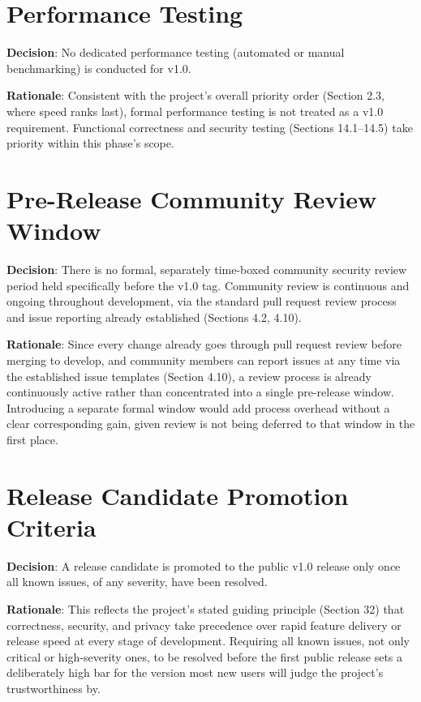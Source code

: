 \section{Performance Testing}
\textbf{Decision}: No dedicated performance testing (automated or manual benchmarking) is conducted for v1.0.

\textbf{Rationale}: Consistent with the project's overall priority order (Section 2.3, where speed ranks last), formal performance testing is not treated as a v1.0 requirement. Functional correctness and security testing (Sections 14.1–14.5) take priority within this phase's scope.
\section{Pre-Release Community Review Window}
\textbf{Decision}: There is no formal, separately time-boxed community security review period held specifically before the v1.0 tag. Community review is continuous and ongoing throughout development, via the standard pull request review process and issue reporting already established (Sections 4.2, 4.10).

\textbf{Rationale}: Since every change already goes through pull request review before merging to develop, and community members can report issues at any time via the established issue templates (Section 4.10), a review process is already continuously active rather than concentrated into a single pre-release window. Introducing a separate formal window would add process overhead without a clear corresponding gain, given review is not being deferred to that window in the first place.
\section{Release Candidate Promotion Criteria}
\textbf{Decision}: A release candidate is promoted to the public v1.0 release only once all known issues, of any severity, have been resolved.

\textbf{Rationale}: This reflects the project's stated guiding principle (Section 32) that correctness, security, and privacy take precedence over rapid feature delivery or release speed at every stage of development. Requiring all known issues, not only critical or high-severity ones, to be resolved before the first public release sets a deliberately high bar for the version most new users will judge the project's trustworthiness by.

\sentinelchapterend
